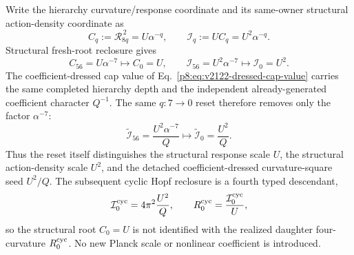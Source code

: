 \documentclass[12pt,a4paper]{article}
\begin{document}
\begin{corollary}
\label{p8:cor:typed-root-action-density-reset}
Write the hierarchy curvature/response coordinate and its same-owner
structural action-density coordinate as
\begin{equation}
\label{p8:eq:root-response-action-density-coordinates}
 C_q:=\mathcal R_{8q}^{\,2}=U\alpha^{-q},
 \qquad
 \mathcal I_q:=U C_q=U^2\alpha^{-q}.
\end{equation}
Structural fresh-root reclosure gives
\begin{equation}
\label{p8:eq:branch-shell-square-reset}
 \boxed{C_{56}=U\alpha^{-7}\longmapsto C_0=U},
 \qquad
 \boxed{\mathcal I_{56}=U^2\alpha^{-7}
 \longmapsto\mathcal I_0=U^2.}
\end{equation}
The coefficient-dressed cap value of
Eq.~\eqref{p8:eq:v2122-dressed-cap-value} carries the same completed hierarchy
depth and the independent already-generated coefficient character \(Q^{-1}\).
The same \(q:7\to0\) reset therefore removes only the factor \(\alpha^{-7}\):
\begin{equation}
\label{p8:eq:v2122-dressed-root-reset}
 \boxed{
 \widetilde{\mathcal I}_{56}=\frac{U^2\alpha^{-7}}Q
 \longmapsto
 \widetilde{\mathcal I}_0=\frac{U^2}{Q}.}
\end{equation}
Thus the reset itself distinguishes the structural response scale \(U\), the
structural action-density scale \(U^2\), and the detached coefficient-dressed
curvature-square seed \(U^2/Q\).  The subsequent cyclic Hopf reclosure is a
fourth typed descendant,
\[
 \mathcal I_0^{\rm cyc}=4\pi^2\frac{U^2}{Q},
 \qquad
 R_0^{\rm cyc}=\frac{\mathcal I_0^{\rm cyc}}U,
\]
so the structural root \(C_0=U\) is not identified with the realized daughter
four-curvature \(R_0^{\rm cyc}\).  No new Planck scale or nonlinear coefficient
is introduced.
\end{corollary}
\end{document}
